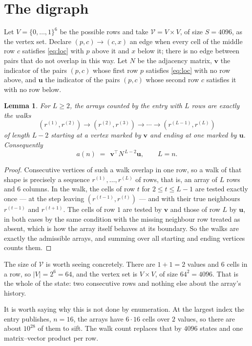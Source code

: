 \documentclass[11pt,a4paper]{article}
\theoremstyle{plain}
\newtheorem{lemma}[theorem]{Lemma}
\theoremstyle{definition}
\begin{document}
\section{The digraph}

Let $V=\{0,\dots,1\}^{6}$ be the possible rows and take
$\mathcal V=V\times V$, of size $S=4096$, as the vertex set. Declare $(p,c)\to(c,x)$ an edge
when every cell of the middle row $c$ satisfies \eqref{eq:loc} with $p$ above it and $x$
below it; there is no edge between pairs that do not overlap in this way. Let $N$ be the
adjacency matrix, $\mathbf{v}$ the indicator of the pairs $(p,c)$ whose first row $p$
satisfies \eqref{eq:loc} with no row above, and $\mathbf{u}$ the indicator of
the pairs $(p,c)$ whose second row $c$ satisfies it with no row below.

\begin{lemma}\label{lem:walk}
For $L\ge2$, the arrays counted by the entry with $L$ rows are exactly the walks
\[
(r^{(1)},r^{(2)})\to(r^{(2)},r^{(3)})\to\cdots\to(r^{(L-1)},r^{(L)})
\]
of length $L-2$ starting at a vertex marked by $\mathbf{v}$ and ending at one marked by
$\mathbf{u}$. Consequently
\[
a(n)\;=\;\,\mathbf{v}^{\!\top}N^{\,L-2}\mathbf{u},\qquad L=n .
\]
\end{lemma}

\begin{proof}
Consecutive vertices of such a walk overlap in one row, so a walk of that shape is
precisely a sequence $r^{(1)},\dots,r^{(L)}$ of rows, that is, an array of $L$ rows
and $6$ columns. In the walk, the cells of row $t$ for $2\le t\le L-1$ are tested
exactly once --- at the step leaving $(r^{(t-1)},r^{(t)})$ --- and with their true
neighbours $r^{(t-1)}$ and $r^{(t+1)}$. The cells of row $1$ are tested by
$\mathbf{v}$ and those of row $L$ by $\mathbf{u}$, in both cases by the same condition
with the missing neighbour row treated as absent, which is how the array itself behaves at
its boundary. So the walks are exactly the admissible arrays, and summing over all starting
and ending vertices counts them.
\end{proof}


The size of $\mathcal V$ is worth seeing concretely. There are $1+1=2$ values
and $6$ cells in a row, so $|V|=2^{6}=64$, and the vertex set is
$V\times V$, of size $64^2=4096$. That is the whole of the state: two consecutive
rows and nothing else about the array's history.

It is worth saying why this is not done by enumeration. At the largest index the entry
publishes, $n=16$, the arrays have $6\cdot16$ cells over
$2$ values, so there are about $10^{28}$ of them to sift. The
walk count replaces that by $4096$ states and one matrix--vector product per row.
\end{document}
